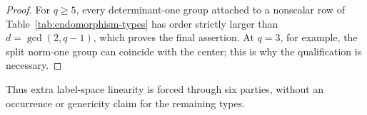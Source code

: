 \begin{proof}
For \(q\geq5\), every determinant-one group attached to a nonscalar row of
Table~\ref{tab:endomorphism-types} has order strictly larger than
\(d=\gcd(2,q-1)\), which proves the final assertion.  At \(q=3\), for
example, the split norm-one group can coincide with the center; this is why
the qualification is necessary.
\end{proof}

Thus extra label-space linearity is forced through six parties, without an
occurrence or genericity claim for the remaining types.
